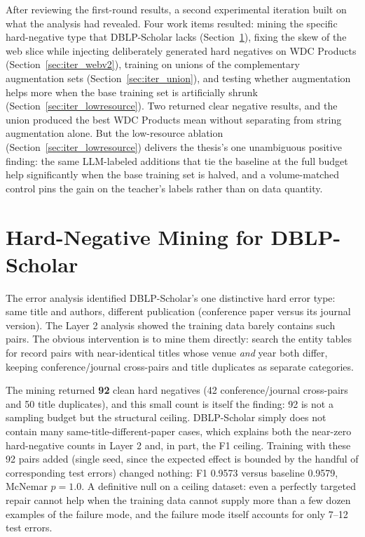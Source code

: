 \documentclass[a4paper,oneside,bibliography=totoc]{scrbook}
\begin{document}
After reviewing the first-round results, a second experimental iteration built on what the analysis had revealed. Four work items resulted: mining the specific hard-negative type that DBLP-Scholar lacks (Section~\ref{sec:iter_hardneg}), fixing the skew of the web slice while injecting deliberately generated hard negatives on WDC Products (Section~\ref{sec:iter_webv2}), training on unions of the complementary augmentation sets (Section~\ref{sec:iter_union}), and testing whether augmentation helps more when the base training set is artificially shrunk (Section~\ref{sec:iter_lowresource}). Two returned clear negative results, and the union produced the best WDC Products mean without separating from string augmentation alone. But the low-resource ablation (Section~\ref{sec:iter_lowresource}) delivers the thesis's one unambiguous positive finding: the same LLM-labeled additions that tie the baseline at the full budget help significantly when the base training set is halved, and a volume-matched control pins the gain on the teacher's labels rather than on data quantity.

\section{Hard-Negative Mining for DBLP-Scholar}
\label{sec:iter_hardneg}

The error analysis identified DBLP-Scholar's one distinctive hard error type: same title and authors, different publication (conference paper versus its journal version). The Layer 2 analysis showed the training data barely contains such pairs. The obvious intervention is to mine them directly: search the entity tables for record pairs with near-identical titles whose venue \emph{and} year both differ, keeping conference/journal cross-pairs and title duplicates as separate categories.

The mining returned \textbf{92} clean hard negatives (42 conference/journal cross-pairs and 50 title duplicates), and this small count is itself the finding: 92 is not a sampling budget but the structural ceiling. DBLP-Scholar simply does not contain many same-title-different-paper cases, which explains both the near-zero hard-negative counts in Layer 2 and, in part, the F1 ceiling. Training with these 92 pairs added (single seed, since the expected effect is bounded by the handful of corresponding test errors) changed nothing: F1 0.9573 versus baseline 0.9579, McNemar $p = 1.0$. A definitive null on a ceiling dataset: even a perfectly targeted repair cannot help when the training data cannot supply more than a few dozen examples of the failure mode, and the failure mode itself accounts for only 7--12 test errors.
\end{document}
